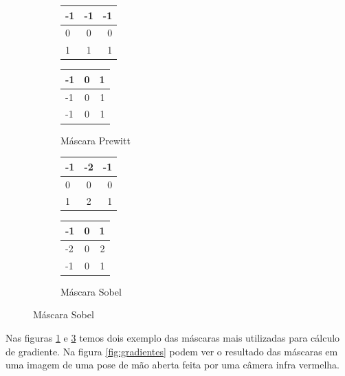 \begin{figure}
	\centering
	\begin{subfigure}[b]{0.3\textwidth}
	\begin{center}
		\begin{tabular}{| l | c | r |}
		\hline
		-1 & -1 & -1 	\\ \hline
		0 & 0 & 0 		\\ \hline
		1 & 1 & 1 		\\ \hline
		\end{tabular}
		\begin{tabular}{| l | c | r |}
		\hline
		-1 & 0 & 1	 	\\ \hline
		-1 & 0 & 1 		\\ \hline
		-1 & 0 & 1 		\\ \hline
		\end{tabular}
		\caption{Máscara Prewitt}
		\label{fig:gradiente_prewitt}
	\end{center}
	\end{subfigure}
	\begin{subfigure}[b]{0.3\textwidth}
	\begin{center}
		\begin{tabular}{| l | c | r |}
		\hline
		-1 & -2 & -1 	\\ \hline
		0 & 0 & 0 		\\ \hline
		1 & 2 & 1 		\\ \hline
		\end{tabular}
		\begin{tabular}{| l | c | r |}
		\hline
		-1 & 0 & 1	 	\\ \hline
		-2 & 0 & 2 		\\ \hline
		-1 & 0 & 1 		\\ \hline
		\end{tabular}
		\caption{Máscara Sobel}
		\label{fig:gradiente_sobel}
	\end{center}
	\end{subfigure}
\end{figure}

Nas figuras \ref{fig:gradiente_prewitt} e \ref{fig:gradiente_sobel} temos dois exemplo das máscaras mais utilizadas para cálculo de gradiente. Na figura \ref{fig:gradientes} podem ver o resultado das máscaras em uma imagem de uma pose de mão aberta feita por uma câmera infra vermelha.

